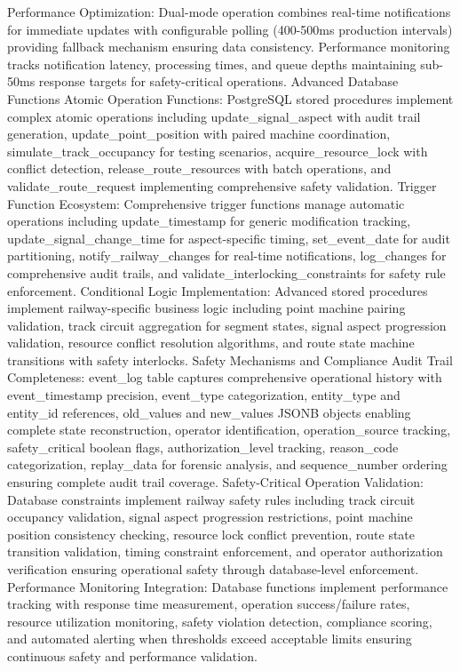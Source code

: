 Performance Optimization: Dual-mode operation combines real-time notifications for immediate updates with configurable polling (400-500ms production intervals) providing fallback mechanism ensuring data consistency. Performance monitoring tracks notification latency, processing times, and queue depths maintaining sub-50ms response targets for safety-critical operations.
Advanced Database Functions
Atomic Operation Functions: PostgreSQL stored procedures implement complex atomic operations including update_signal_aspect with audit trail generation, update_point_position with paired machine coordination, simulate_track_occupancy for testing scenarios, acquire_resource_lock with conflict detection, release_route_resources with batch operations, and validate_route_request implementing comprehensive safety validation.
Trigger Function Ecosystem: Comprehensive trigger functions manage automatic operations including update_timestamp for generic modification tracking, update_signal_change_time for aspect-specific timing, set_event_date for audit partitioning, notify_railway_changes for real-time notifications, log_changes for comprehensive audit trails, and validate_interlocking_constraints for safety rule enforcement.
Conditional Logic Implementation: Advanced stored procedures implement railway-specific business logic including point machine pairing validation, track circuit aggregation for segment states, signal aspect progression validation, resource conflict resolution algorithms, and route state machine transitions with safety interlocks.
Safety Mechanisms and Compliance
Audit Trail Completeness: event_log table captures comprehensive operational history with event_timestamp precision, event_type categorization, entity_type and entity_id references, old_values and new_values JSONB objects enabling complete state reconstruction, operator identification, operation_source tracking, safety_critical boolean flags, authorization_level tracking, reason_code categorization, replay_data for forensic analysis, and sequence_number ordering ensuring complete audit trail coverage.
Safety-Critical Operation Validation: Database constraints implement railway safety rules including track circuit occupancy validation, signal aspect progression restrictions, point machine position consistency checking, resource lock conflict prevention, route state transition validation, timing constraint enforcement, and operator authorization verification ensuring operational safety through database-level enforcement.
Performance Monitoring Integration: Database functions implement performance tracking with response time measurement, operation success/failure rates, resource utilization monitoring, safety violation detection, compliance scoring, and automated alerting when thresholds exceed acceptable limits ensuring continuous safety and performance validation.
